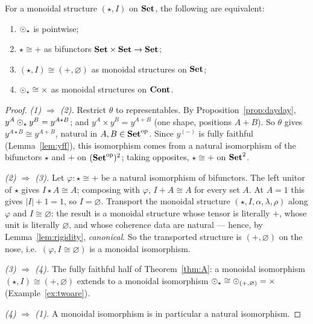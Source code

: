 \begin{Theorem}\label{thm:B}
For a monoidal structure $(\star,I)$ on $\mathbf{Set}$, the following are equivalent:
\begin{enumerate}[nosep,label=(\arabic*)]
\item $\mathbin{\odot}_\star$ is pointwise;
\item $\star\cong +$ as bifunctors $\mathbf{Set}\times\mathbf{Set}\to\mathbf{Set}$;
\item $(\star,I)\cong(+,\varnothing)$ as monoidal structures on $\mathbf{Set}$;
\item $\mathbin{\odot}_\star\cong\times$ as monoidal structures on $\mathbf{Cont}$.
\end{enumerate}
\end{Theorem}

\begin{proof}
\emph{(1) $\Rightarrow$ (2).} Restrict $\theta$ to representables. By
Proposition~\ref{prop:dayday}, $y^A\mathbin{\odot}_\star y^B=y^{A\star B}$; and
$y^A\times y^B=y^{A+B}$ (one shape, positions $A+B$). So $\theta$ gives
$y^{A\star B}\cong y^{A+B}$, natural in $A,B\in\mathbf{Set}^{\mathrm{op}}$. Since
$y^{(-)}$ is fully faithful (Lemma~\ref{lem:yff}), this isomorphism comes from a
natural isomorphism of the bifunctors $\star$ and $+$ on
$(\mathbf{Set}^{\mathrm{op}})^2$; taking opposites, $\star\cong +$ on $\mathbf{Set}^2$.

\emph{(2) $\Rightarrow$ (3).} Let $\varphi\colon\star\cong +$ be a natural
isomorphism of bifunctors. The left unitor of $\star$ gives $I\star A\cong A$;
composing with $\varphi$, $I+A\cong A$ for every set $A$. At $A=1$ this gives
$|I|+1=1$, so $I=\varnothing$. Transport the monoidal structure
$(\star,I,\alpha,\lambda,\rho)$ along $\varphi$ and $I\cong\varnothing$: the
result is a monoidal structure whose tensor is literally $+$, whose unit is
literally $\varnothing$, and whose coherence data are natural --- hence, by
Lemma~\ref{lem:rigidity}, \emph{canonical}. So the transported structure is
$(+,\varnothing)$ on the nose, i.e.\ $(\varphi, I\cong\varnothing)$ is a monoidal
isomorphism.

\emph{(3) $\Rightarrow$ (4).} The fully faithful half of Theorem~\ref{thm:A}:
a monoidal isomorphism $(\star,I)\cong(+,\varnothing)$ extends to a monoidal
isomorphism $\mathbin{\odot}_\star\cong\mathbin{\odot}_{(+,\varnothing)}=\times$
(Example~\ref{ex:twoare}).

\emph{(4) $\Rightarrow$ (1).} A monoidal isomorphism is in particular a natural
isomorphism.
\end{proof}

